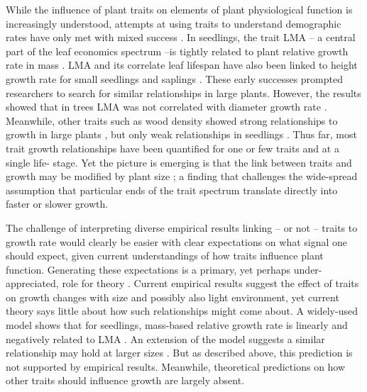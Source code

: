 \documentclass[12pt, a4paper]{article}
\begin{document}
While the influence of plant traits on elements of plant physiological
function is increasingly understood, attempts at using traits to understand
demographic rates have only met with mixed success
\citep{wright_functional_2010, poorter_are_2008}. In seedlings, the trait LMA
-- a central part of the leaf economics spectrum
\citep{wright_world_wide_2004} --is tightly related to plant relative growth
rate in mass \citep{lambers_inherent_1992, wright_cross_species_2000}. LMA and
its correlate leaf lifespan have also been linked to height growth rate for
small seedlings and saplings \citep{reich_leaf_1992, poorter_leaf_2006}. These
early successes prompted researchers to search for similar relationships in
large plants. However, the results showed that in trees LMA was not correlated
with diameter growth rate  \citep{wright_functional_2010, poorter_are_2008,
herault_functional_2011}. Meanwhile, other traits such as wood density showed
strong relationships to growth in large plants \citep{wright_functional_2010},
but only weak relationships in seedlings  \citep{castro-diez_stem_1998}. Thus
far, most trait growth relationships have been quantified for one or few
traits and at a single life- stage. Yet the picture is emerging is that the
link between traits and growth may be modified by plant size
\citep{ruger_functional_2012}; a finding that challenges the wide-spread
assumption that particular ends of the trait spectrum translate directly into
faster or slower growth.

The challenge of interpreting diverse empirical results linking  -- or not --
traits to growth rate would clearly be easier with clear expectations on what
signal one should expect, given current understandings of how traits influence
plant function. Generating these expectations is a primary, yet perhaps under-
appreciated, role for theory \citep{kokko_modelling_2007}. Current empirical
results suggest the effect of traits on growth changes with size and possibly
also light environment, yet current theory says little about how such
relationships might come about. A widely-used model shows that for seedlings,
mass-based relative growth rate is linearly and negatively related to LMA
\citep{lambers_inherent_1992, cornelissen_seedling_1996,
wright_cross_species_2000}. An extension of the model suggests a similar
relationship may hold at larger sizes \citep{enquist_general_2007}. But as
described above, this prediction is not supported by empirical results.
Meanwhile, theoretical predictions on how other traits should influence growth
are largely absent.
\end{document}
